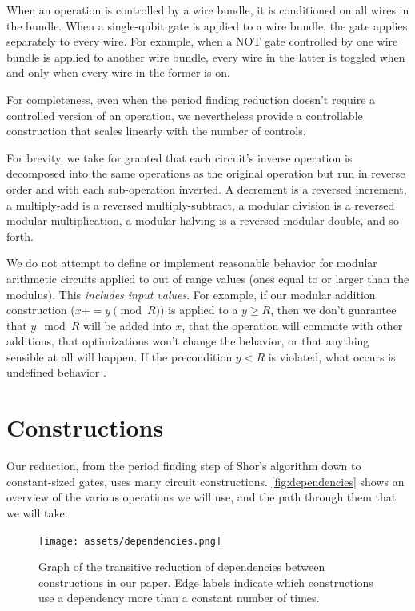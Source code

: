 \documentclass[twocolumn,longbibliography]{quantumarticle-customized}
\begin{document}
When an operation is controlled by a wire bundle, it is conditioned on all wires in the bundle.
When a single-qubit gate is applied to a wire bundle, the gate applies separately to every wire.
For example, when a NOT gate controlled by one wire bundle is applied to another wire bundle, every wire in the latter is toggled when and only when every wire in the former is on.

For completeness, even when the period finding reduction doesn't require a controlled version of an operation, we nevertheless provide a controllable construction that scales linearly with the number of controls.

For brevity, we take for granted that each circuit's inverse operation is decomposed into the same operations as the original operation but run in reverse order and with each sub-operation inverted.
A decrement is a reversed increment, a multiply-add is a reversed multiply-subtract, a modular division is a reversed modular multiplication, a modular halving is a reversed modular double, and so forth.

We do not attempt to define or implement reasonable behavior for modular arithmetic circuits applied to out of range values (ones equal to or larger than the modulus).
This {\em includes input values}.
For example, if our modular addition construction ($x \mathrel{{+}{=}} y \pmod{R}$) is applied to a $y \geq R$, then we don't guarantee that $y \mod R$ will be added into $x$, that the operation will commute with other additions, that optimizations won't change the behavior, or that anything sensible at all will happen.
If the precondition $y < R$ is violated, what occurs is undefined behavior \cite{c11}.


\section{Constructions} \label{sec:construct}

Our reduction, from the period finding step of Shor's algorithm down to constant-sized gates, uses many circuit constructions.
\autoref{fig:dependencies} shows an overview of the various operations we will use, and the path through them that we will take.

\begin{figure}
  \centering
  \texttt{[image: assets/dependencies.png]}
  \caption{
    Graph of the transitive reduction of dependencies between constructions in our paper.
    Edge labels indicate which constructions use a dependency more than a constant number of times.
  }
  \label{fig:dependencies}
\end{figure}
\end{document}
